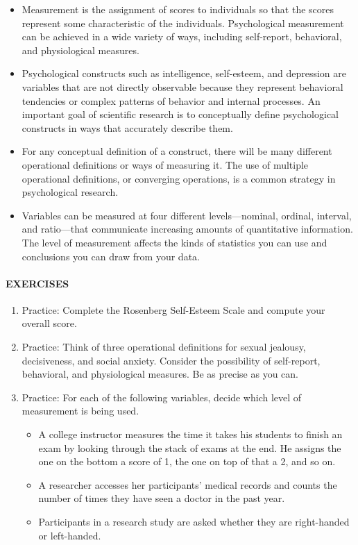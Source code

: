 \documentclass[
]{krantz}
\providecommand{\tightlist}{%
  \setlength{\itemsep}{0pt}\setlength{\parskip}{0pt}}
\begin{document}
\begin{itemize}
\tightlist
\item
  Measurement is the assignment of scores to individuals so that the scores represent some characteristic of the individuals. Psychological measurement can be achieved in a wide variety of ways, including self-report, behavioral, and physiological measures.
\item
  Psychological constructs such as intelligence, self-esteem, and depression are variables that are not directly observable because they represent behavioral tendencies or complex patterns of behavior and internal processes. An important goal of scientific research is to conceptually define psychological constructs in ways that accurately describe them.
\item
  For any conceptual definition of a construct, there will be many different operational definitions or ways of measuring it. The use of multiple operational definitions, or converging operations, is a common strategy in psychological research.
\item
  Variables can be measured at four different levels---nominal, ordinal, interval, and ratio---that communicate increasing amounts of quantitative information. The level of measurement affects the kinds of statistics you can use and conclusions you can draw from your data.
\end{itemize}

\paragraph*{EXERCISES}\label{exercises-8}

\begin{enumerate}
\def\labelenumi{\arabic{enumi}.}
\tightlist
\item
  Practice: Complete the Rosenberg Self-Esteem Scale and compute your overall score.
\item
  Practice: Think of three operational definitions for sexual jealousy, decisiveness, and social anxiety. Consider the possibility of self-report, behavioral, and physiological measures. Be as precise as you can.
\item
  Practice: For each of the following variables, decide which level of measurement is being used.

  \begin{itemize}
  \tightlist
  \item
    A college instructor measures the time it takes his students to finish an exam by looking through the stack of exams at the end. He assigns the one on the bottom a score of 1, the one on top of that a 2, and so on.
  \item
    A researcher accesses her participants' medical records and counts the number of times they have seen a doctor in the past year.
  \item
    Participants in a research study are asked whether they are right-handed or left-handed.
  \end{itemize}
\end{enumerate}
\end{document}
